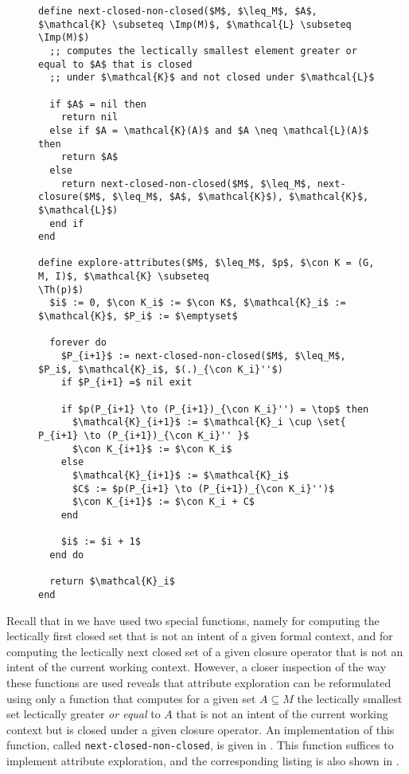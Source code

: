\begin{figure}[tp]
  \begin{Algorithm}
  \label{alg:explore-attributes-with-next-closed-none-closed}
  \hspace*{0cm}
\begin{lstlisting}
define next-closed-non-closed($M$, $\leq_M$, $A$, $\mathcal{K} \subseteq \Imp(M)$, $\mathcal{L} \subseteq \Imp(M)$)
  ;; computes the lectically smallest element greater or equal to $A$ that is closed
  ;; under $\mathcal{K}$ and not closed under $\mathcal{L}$

  if $A$ = nil then
    return nil
  else if $A = \mathcal{K}(A)$ and $A \neq \mathcal{L}(A)$ then
    return $A$
  else
    return next-closed-non-closed($M$, $\leq_M$, next-closure($M$, $\leq_M$, $A$, $\mathcal{K}$), $\mathcal{K}$, $\mathcal{L}$)
  end if
end

define explore-attributes($M$, $\leq_M$, $p$, $\con K = (G, M, I)$, $\mathcal{K} \subseteq
\Th(p)$)
  $i$ := 0, $\con K_i$ := $\con K$, $\mathcal{K}_i$ := $\mathcal{K}$, $P_i$ := $\emptyset$

  forever do
    $P_{i+1}$ := next-closed-non-closed($M$, $\leq_M$, $P_i$, $\mathcal{K}_i$, $(.)_{\con K_i}''$)
    if $P_{i+1} =$ nil exit

    if $p(P_{i+1} \to (P_{i+1})_{\con K_i}'') = \top$ then
      $\mathcal{K}_{i+1}$ := $\mathcal{K}_i \cup \set{ P_{i+1} \to (P_{i+1})_{\con K_i}'' }$
      $\con K_{i+1}$ := $\con K_i$
    else
      $\mathcal{K}_{i+1}$ := $\mathcal{K}_i$
      $C$ := $p(P_{i+1} \to (P_{i+1})_{\con K_i}'')$
      $\con K_{i+1}$ := $\con K_i + C$
    end

    $i$ := $i + 1$
  end do

  return $\mathcal{K}_i$  
end
\end{lstlisting}
  \end{Algorithm}
\end{figure}

Recall that in  we have used two special functions, namely
for computing the lectically first closed set that is not an intent of a given formal
context, and for computing the lectically next closed set of a given closure operator that
is not an intent of the current working context.  However, a closer inspection of the way
these functions are used reveals that attribute exploration can be reformulated using only
a function that computes for a given set $A \subseteq M$ the lectically smallest set
lectically greater \emph{or equal} to $A$ that is not an intent of the current working
context but is closed under a given closure operator.  An implementation of this function,
called \lstinline{next-closed-non-closed}, is given in
.  This function suffices to
implement attribute exploration, and the corresponding listing is also shown in
.

